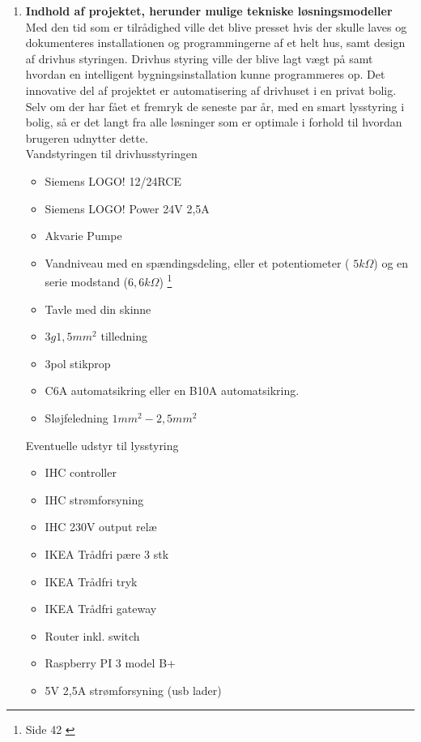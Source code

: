 \begin{enumerate}
    \item \textbf{Indhold af projektet, herunder mulige tekniske løsningsmodeller} \\ 
    Med den tid som er tilrådighed ville det blive presset hvis der skulle laves og dokumenteres installationen og programmingerne af et helt hus, samt design af drivhus styringen. 
    Drivhus styring ville der blive lagt vægt på samt hvordan en intelligent bygningsinstallation kunne programmeres op.
    Det innovative del af projektet er automatisering af drivhuset i en privat bolig. Selv om der har fået et fremryk de seneste par år, med en smart lysstyring i bolig, så er det langt fra alle løsninger som er optimale i forhold til hvordan brugeren udnytter dette. 
    \\
    Vandstyringen til drivhusstyringen
    \begin{itemize}
        \item Siemens LOGO! 12/24RCE
        \item Siemens LOGO! Power 24V 2,5A
        \item Akvarie Pumpe
        \item Vandniveau med en spændingsdeling, eller et potentiometer ( $5k\Omega$) og en serie modstand ($6,6k\Omega$) \footnote{Side 42 \cite{logo_sm} }
        \item Tavle med din skinne
        \item $3g1,5mm^2$ tilledning
        \item 3pol stikprop
        \item C6A automatsikring eller en B10A automatsikring.
        \item Sløjfeledning $1mm^2 - 2,5mm^2$
    \end{itemize}
    Eventuelle udstyr til lysstyring
    \begin{itemize}
        \item IHC controller
        \item IHC strømforsyning
        \item IHC 230V output relæ
        \item IKEA Trådfri pære 3 stk
        \item IKEA Trådfri tryk
        \item IKEA Trådfri gateway
        \item Router inkl. switch
        \item Raspberry PI 3 model B+
        \item 5V 2,5A strømforsyning (usb lader)
    \end{itemize}


\end{enumerate}
